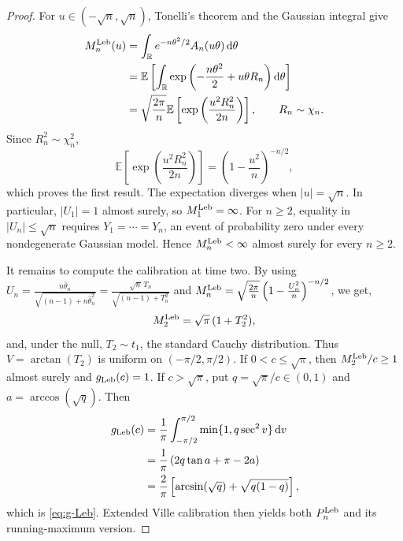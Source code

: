 \documentclass{article}
\begin{document}
\begin{proof}
For \(u\in(-\sqrt n,\sqrt n)\), Tonelli's theorem and the Gaussian
integral give
\begin{align*}
  M_n^{\mathrm{Leb}}(u)
  &=
  \int_{\mathbb R}
  e^{-n\theta^2/2}A_n(u\theta)\,\mathrm{d}\theta
  \\
  &=
  \mathbb E\left[
    \int_{\mathbb R}
    \exp\left(-\frac{n\theta^2}{2}+u\theta R_n\right)
    \mathrm{d}\theta
  \right]
  \\
  &=
  \sqrt{\frac{2\pi}{n}}
  \mathbb E\left[
    \exp\left(\frac{u^2R_n^2}{2n}\right)
  \right],
  \qquad R_n\sim\chi_n.
\end{align*}
Since \(R_n^2\sim\chi_n^2\),
\[
  \mathbb E\left[
    \exp\left(\frac{u^2R_n^2}{2n}\right)
  \right]
  =
  \left(1-\frac{u^2}{n}\right)^{-n/2},
\]
which proves the first result. The expectation diverges when
\(|u|=\sqrt n\). In particular, \(|U_1|=1\) almost surely, so
\(M_1^{\mathrm{Leb}}=\infty\). For \(n\geq2\), equality in
\(|U_n|\leq\sqrt n\) requires \(Y_1=\cdots=Y_n\), an event of
probability zero under every nondegenerate Gaussian model. Hence
\(M_n^{\mathrm{Leb}}<\infty\) almost surely for every \(n\geq2\).

It remains to compute the calibration at time two. By
using $U_n
  =
  \frac{n\widehat\theta_n}
       {\sqrt{(n-1)+n\widehat\theta_n^2}}
  =
  \frac{\sqrt n\,T_n}
       {\sqrt{(n-1)+T_n^2}}$ and $M_n^{\mathrm{Leb}}
  =
  \sqrt{\frac{2\pi}{n}}
  \left(1-\frac{U_n^2}{n}\right)^{-n/2}$, we get,
\[
  M_2^{\mathrm{Leb}}
  =
  \sqrt\pi\,(1+T_2^2),
\]
and, under the null, \(T_2\sim t_1\), the standard Cauchy
distribution. Thus \(V=\arctan(T_2)\) is uniform on
\((-\pi/2,\pi/2)\). If \(0<c\leq\sqrt\pi\), then
\(M_2^{\mathrm{Leb}}/c\geq1\) almost surely and \(g_{\mathrm{Leb}}(c)=1\). If
\(c>\sqrt\pi\), put \(q=\sqrt\pi/c\in(0,1)\) and
\(a=\arccos(\sqrt q)\). Then
\begin{align*}
  g_{\mathrm{Leb}}(c)
  &=
  \frac1\pi
  \int_{-\pi/2}^{\pi/2}
  \min\{1,q\sec^2 v\}\,\mathrm{d} v
  \\
  &=
  \frac1\pi
  \left(
    2q\tan a+\pi-2a
  \right)
  \\
  &=
  \frac{2}{\pi}
  \left[
    \arcsin(\sqrt q)+\sqrt{q(1-q)}
  \right],
\end{align*}
which is \eqref{eq:g-Leb}. Extended Ville calibration then yields both $P_n^{\mathrm{Leb}}$ and its running-maximum version.


\end{proof}
\end{document}
